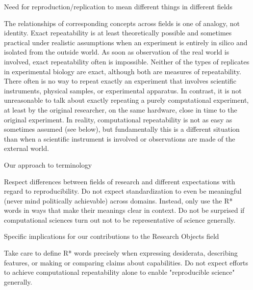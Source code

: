 		Need for reproduction/replication to mean different things in different fields

			The relationships of corresponding concepts across fields is one of analogy, not identity.
			Exact repeatability is at least theoretically possible and sometimes practical under realistic assumptions when an experiment
				is entirely in silico and isolated from the outside world.
			As soon as observation of the real world is involved, exact repeatability often is impossible.
			Neither of the types of replicates in experimental biology are exact, although both are measures of repeatability.
			There often is no way to repeat exactly an experiment that involves scientific instruments, physical samples, or experimental apparatus.
			In contrast, it is not unreasonable to talk about exactly repeating a purely computational experiment, at least by the original researcher,
				on the same hardware, close in time to the original experiment.
			In reality, computational repeatability is not as easy as sometimes assumed (see below), but fundamentally this is
				a different situation than when a scientific instrument is involved or observations are made of the external world.

		Our approach to terminology

			Respect differences between fields of research and different expectations with regard to reproducibility.
			Do not expect standardization to even be meaningful (never mind politically achievable) across domains.
			Instead, only use the R* words in ways that make their meanings clear in context.
			Do not be surprised if computational sciences turn out not to be representative of science generally.

		Specific implications for our contributions to the Research Objects field

			Take care to define R* words precisely when expressing desiderata, describing features, or making or comparing claims about capabilities.
			Do not expect efforts to achieve computational repeatability alone to enable "reproducible science" generally.


